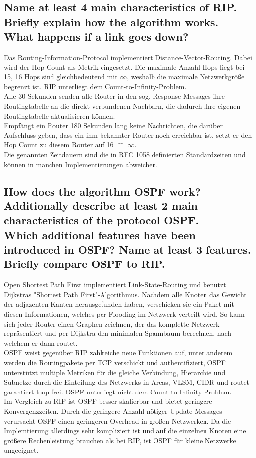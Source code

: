\documentclass[a4paper,
			llpt,
			solution,
			accentcolor=tud2d,
			colorbacktitle
			]
			{tudexercise}
\newcommand{\8}{$\infty$}
\begin{document}
\subsection{Name at least 4 main characteristics of RIP.\\Briefly explain how the algorithm works.\\ What happens if a link goes down?}
Das Routing-Information-Protocol implementiert Distance-Vector-Routing. Dabei wird der Hop Count als Metrik eingesetzt. Die maximale Anzahl Hops liegt bei 15, 16 Hops sind gleichbedeutend mit \8, weshalb die maximale Netzwerkgröße begrenzt ist. RIP unterliegt dem Count-to-Infinity-Problem.\\
Alle 30 Sekunden senden alle Router in den sog. Response Messages ihre Routingtabelle an die direkt verbundenen Nachbarn, die dadurch ihre eigenen Routingtabelle aktualisieren können.\\
Empfängt ein Router 180 Sekunden lang keine Nachrichten, die darüber Aufschluss geben, dass ein ihm bekannter Router noch erreichbar ist, setzt er den Hop Count zu diesem Router auf 16 $\hat{=}$ \8.\\
Die genannten Zeitdauern sind die in RFC 1058 definierten Standardzeiten und können in manchen Implementierungen abweichen.
\subsection{How does the algorithm OSPF work?\\Additionally describe at least 2 main characteristics  of the protocol OSPF.\\Which additional features have been introduced in OSPF? Name at least 3 features.\\Briefly compare OSPF to RIP.}
Open Shortest Path First implementiert Link-State-Routing und benutzt Dijkstras "Shortest Path First"-Algorithmus. Nachdem alle Knoten das Gewicht der adjazenten Kanten herausgefunden haben, verschicken sie ein Paket mit diesen Informationen, welches per Flooding im Netzwerk verteilt wird. So kann sich jeder Router einen Graphen zeichnen, der das komplette Netzwerk repräsentiert und per Dijkstra den minimalen Spannbaum berechnen, nach welchem er dann routet.\\

OSPF weist gegenüber RIP zahlreiche neue Funktionen auf, unter anderem werden die Routingpakete per TCP verschickt und authentifiziert, OSPF unterstützt multiple Metriken für die gleiche Verbindung, Hierarchie und Subnetze durch die Einteilung des Netzwerks in Areas, VLSM, CIDR und routet garantiert loop-frei. OSPF unterliegt nicht dem Count-to-Infinity-Problem.\\
Im Vergleich zu RIP ist OSPF besser skalierbar und bietet geringere Konvergenzzeiten. Durch die geringere Anzahl nötiger Update Messages verursacht OSPF einen geringeren Overhead in großen Netzwerken. Da die Implemtierung allerdings sehr kompliziert ist und auf die einzelnen Knoten eine größere Rechenleistung brauchen als bei RIP, ist OSPF für kleine Netzwerke ungeeignet.
\end{document}
